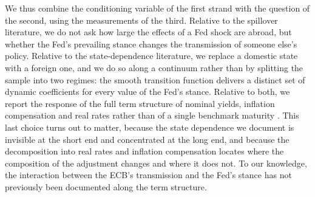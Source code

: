 We thus combine the conditioning variable of the first strand with the question of the second, using the measurements of the third. Relative to the spillover literature, we do not ask how large the effects of a Fed shock are abroad, but whether the Fed's prevailing stance changes the transmission of someone else's policy. Relative to the state-dependence literature, we replace a domestic state with a foreign one, and we do so along a continuum rather than by splitting the sample into two regimes: the smooth transition function delivers a distinct set of dynamic coefficients for every value of the Fed's stance. Relative to both, we report the response of the full term structure of nominal yields, inflation compensation and real rates rather than of a single benchmark maturity \citep[thus following][]{boraugan2020term}. This last choice turns out to matter, because the state dependence we document is invisible at the short end and concentrated at the long end, and because the decomposition into real rates and inflation compensation locates where the composition of the adjustment changes and where it does not. To our knowledge, the interaction between the ECB's transmission and the Fed's stance has not previously been documented along the term structure.%
